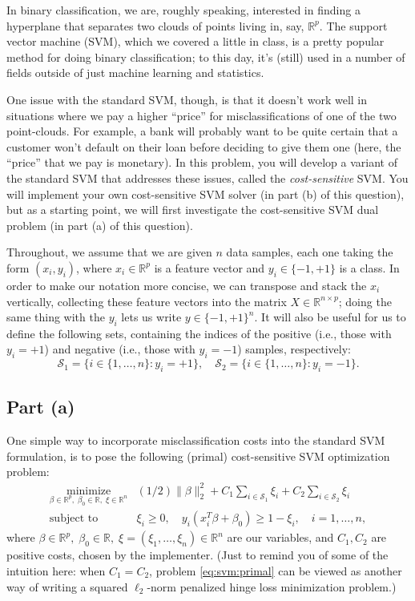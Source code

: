 \documentclass{article}
\theoremstyle{remark}
\theoremstyle{definition}
\newcommand{\minimize}{\mathop{\mathrm{minimize}}}
\newcommand{\minimizewrt}[1]{\underset{#1}{\minimize}}
\newcommand{\subjectto}{\mbox{subject to}}
\newcommand{\reals}{\mathbb R}
\begin{document}
In binary classification, we are, roughly speaking, interested in finding a hyperplane that separates two clouds of points living in, say, $\reals^p$.  The support vector machine (SVM), which we covered a little in class, is a pretty popular method for doing binary classification; to this day, it's (still) used in a number of fields outside of just machine learning and statistics.

One issue with the standard SVM, though, is that it doesn't work well in situations where we pay a higher ``price'' for misclassifications of one of the two point-clouds.  For example, a bank will probably want to be quite certain that a customer won't default on their loan before deciding to give them one (here, the ``price'' that we pay is monetary).  In this problem, you will develop a variant of the standard SVM that addresses these issues, called the \textit{cost-sensitive} SVM.  You will implement your own cost-sensitive SVM solver (in part (b) of this question), but as a starting point, we will first investigate the cost-sensitive SVM dual problem (in part (a) of this question).

Throughout, we assume that we are given $n$ data samples, each one taking the form $(x_i, y_i)$, where $x_i \in \reals^p$ is a feature vector and $y_i \in \{-1,+1\}$ is a class.  In order to make our notation more concise, we can transpose and stack the $x_i$ vertically, collecting these feature vectors into the matrix $X \in \reals^{n \times p}$; doing the same thing with the $y_i$ lets us write $y \in \{-1,+1\}^n$.  It will also be useful for us to define the following sets, containing the indices of the positive (i.e., those with $y_i = +1$) and negative (i.e., those with $y_i = -1$) samples, respectively:
\[
\mathcal{S}_1 = \{ i \in \{1,\ldots,n\} : y_{i} = +1 \}, \quad \mathcal{S}_2 = \{ i \in \{1,\ldots,n\} : y_{i} = -1 \}.
\]

\subsection*{Part (a)}
One simple way to incorporate misclassification costs into the standard SVM formulation, is to pose the following (primal) cost-sensitive SVM optimization problem:
\begin{equation}
\begin{array}{ll}
\minimizewrt{\beta \in \reals^p, \; \beta_0 \in \reals, \; \xi \in \reals^n} & (1/2) \| \beta \|_2^2 + C_1 \sum_{i \in \mathcal{S}_1} \xi_i + C_2 \sum_{i \in \mathcal{S}_2} \xi_i \\
\subjectto & \xi_i \geq 0, \quad y_i( x_i^T \beta + \beta_0) \geq 1 - \xi_i, \quad i=1,\ldots,n,
\end{array}
\label{eq:svm:primal}
\end{equation}
where $\beta \in \reals^p, \; \beta_0 \in \reals, \; \xi = (\xi_1, \ldots, \xi_n) \in \reals^n$ are our variables, and $C_1, C_2$ are positive costs, chosen by the implementer.  (Just to remind you of some of the intuition here: when $C_1 = C_2$, problem \eqref{eq:svm:primal} can be viewed as another way of writing a squared $\ell_2$-norm penalized hinge loss minimization problem.)
\end{document}
